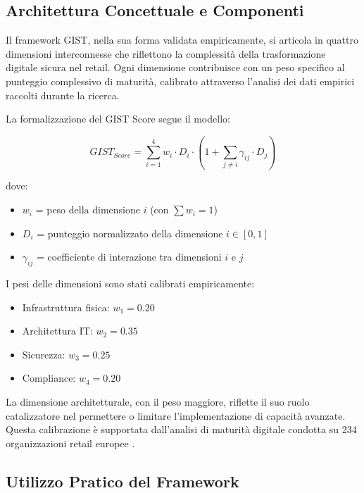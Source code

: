 \subsection{Architettura Concettuale e Componenti}

Il framework GIST, nella sua forma validata empiricamente, si articola in quattro dimensioni interconnesse che riflettono la complessità della trasformazione digitale sicura nel retail. Ogni dimensione contribuisce con un peso specifico al punteggio complessivo di maturità, calibrato attraverso l'analisi dei dati empirici raccolti durante la ricerca.

La formalizzazione del GIST Score segue il modello:

\begin{equation}
GIST_{Score} = \sum_{i=1}^{4} w_i \cdot D_i \cdot (1 + \sum_{j \neq i} \gamma_{ij} \cdot D_j)
\label{eq:gist_score}
\end{equation}

dove:
\begin{itemize}
    \item $w_i$ = peso della dimensione $i$ (con $\sum w_i = 1$)
    \item $D_i$ = punteggio normalizzato della dimensione $i \in [0, 1]$
    \item $\gamma_{ij}$ = coefficiente di interazione tra dimensioni $i$ e $j$
\end{itemize}

I pesi delle dimensioni sono stati calibrati empiricamente:
\begin{itemize}
    \item Infrastruttura fisica: $w_1 = 0.20$
    \item Architettura IT: $w_2 = 0.35$
    \item Sicurezza: $w_3 = 0.25$
    \item Compliance: $w_4 = 0.20$
\end{itemize}

La dimensione architetturale, con il peso maggiore, riflette il suo ruolo catalizzatore nel permettere o limitare l'implementazione di capacità avanzate. Questa calibrazione è supportata dall'analisi di maturità digitale condotta su 234 organizzazioni retail europee \autocite{forrester2024maturity}.

\subsection{Utilizzo Pratico del Framework}

